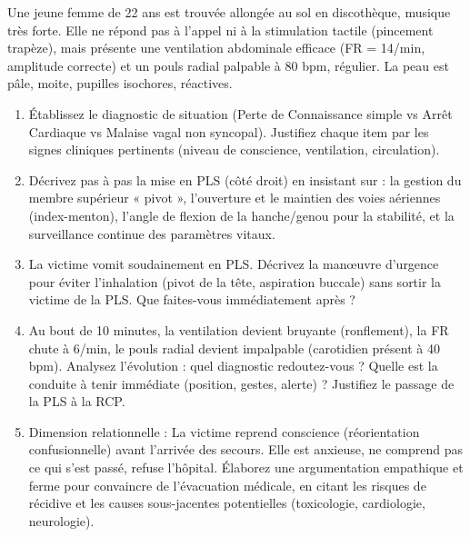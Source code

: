 \documentclass[11pt]{article}
\begin{document}
\begin{exercice}
Une jeune femme de 22 ans est trouvée allongée au sol en discothèque, musique très forte. Elle ne répond pas à l'appel ni à la stimulation tactile (pincement trapèze), mais présente une ventilation abdominale efficace (FR = 14/min, amplitude correcte) et un pouls radial palpable à 80 bpm, régulier. La peau est pâle, moite, pupilles isochores, réactives.
\begin{enumerate}
    \item Établissez le diagnostic de situation (Perte de Connaissance simple vs Arrêt Cardiaque vs Malaise vagal non syncopal). Justifiez chaque item par les signes cliniques pertinents (niveau de conscience, ventilation, circulation).
    \item Décrivez pas à pas la mise en PLS (côté droit) en insistant sur : la gestion du membre supérieur « pivot », l'ouverture et le maintien des voies aériennes (index-menton), l'angle de flexion de la hanche/genou pour la stabilité, et la surveillance continue des paramètres vitaux.
    \item La victime vomit soudainement en PLS. Décrivez la manœuvre d'urgence pour éviter l'inhalation (pivot de la tête, aspiration buccale) sans sortir la victime de la PLS. Que faites-vous immédiatement après ?
    \item Au bout de 10 minutes, la ventilation devient bruyante (ronflement), la FR chute à 6/min, le pouls radial devient impalpable (carotidien présent à 40 bpm). Analysez l'évolution : quel diagnostic redoutez-vous ? Quelle est la conduite à tenir immédiate (position, gestes, alerte) ? Justifiez le passage de la PLS à la RCP.
    \item Dimension relationnelle : La victime reprend conscience (réorientation confusionnelle) avant l'arrivée des secours. Elle est anxieuse, ne comprend pas ce qui s'est passé, refuse l'hôpital. Élaborez une argumentation empathique et ferme pour convaincre de l'évacuation médicale, en citant les risques de récidive et les causes sous-jacentes potentielles (toxicologie, cardiologie, neurologie).
\end{enumerate}
\end{exercice}
\end{document}
